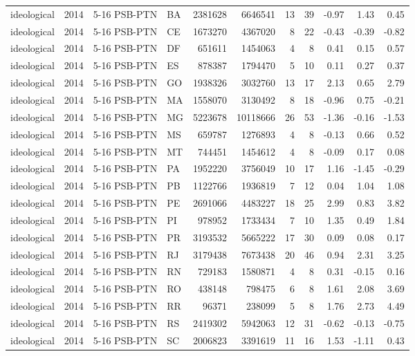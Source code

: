 \begin{landscape}
\begin{longtable}{lllL{1.4cm}rrrrrrr}
ideological & 2014 & 5-16 PSB-PTN & BA & 2381628 & 6646541 & 13 & 39 & -0.97 & 1.43 & 0.45 \\
ideological & 2014 & 5-16 PSB-PTN & CE & 1673270 & 4367020 & 8 & 22 & -0.43 & -0.39 & -0.82 \\
ideological & 2014 & 5-16 PSB-PTN & DF & 651611 & 1454063 & 4 & 8 & 0.41 & 0.15 & 0.57 \\
ideological & 2014 & 5-16 PSB-PTN & ES & 878387 & 1794470 & 5 & 10 & 0.11 & 0.27 & 0.37 \\
ideological & 2014 & 5-16 PSB-PTN & GO & 1938326 & 3032760 & 13 & 17 & 2.13 & 0.65 & 2.79 \\
ideological & 2014 & 5-16 PSB-PTN & MA & 1558070 & 3130492 & 8 & 18 & -0.96 & 0.75 & -0.21 \\
ideological & 2014 & 5-16 PSB-PTN & MG & 5223678 & 10118666 & 26 & 53 & -1.36 & -0.16 & -1.53 \\
ideological & 2014 & 5-16 PSB-PTN & MS & 659787 & 1276893 & 4 & 8 & -0.13 & 0.66 & 0.52 \\
ideological & 2014 & 5-16 PSB-PTN & MT & 744451 & 1454612 & 4 & 8 & -0.09 & 0.17 & 0.08 \\
ideological & 2014 & 5-16 PSB-PTN & PA & 1952220 & 3756049 & 10 & 17 & 1.16 & -1.45 & -0.29 \\
ideological & 2014 & 5-16 PSB-PTN & PB & 1122766 & 1936819 & 7 & 12 & 0.04 & 1.04 & 1.08 \\
ideological & 2014 & 5-16 PSB-PTN & PE & 2691066 & 4483227 & 18 & 25 & 2.99 & 0.83 & 3.82 \\
ideological & 2014 & 5-16 PSB-PTN & PI & 978952 & 1733434 & 7 & 10 & 1.35 & 0.49 & 1.84 \\
ideological & 2014 & 5-16 PSB-PTN & PR & 3193532 & 5665222 & 17 & 30 & 0.09 & 0.08 & 0.17 \\
ideological & 2014 & 5-16 PSB-PTN & RJ & 3179438 & 7673438 & 20 & 46 & 0.94 & 2.31 & 3.25 \\
ideological & 2014 & 5-16 PSB-PTN & RN & 729183 & 1580871 & 4 & 8 & 0.31 & -0.15 & 0.16 \\
ideological & 2014 & 5-16 PSB-PTN & RO & 438148 & 798475 & 6 & 8 & 1.61 & 2.08 & 3.69 \\
ideological & 2014 & 5-16 PSB-PTN & RR & 96371 & 238099 & 5 & 8 & 1.76 & 2.73 & 4.49 \\
ideological & 2014 & 5-16 PSB-PTN & RS & 2419302 & 5942063 & 12 & 31 & -0.62 & -0.13 & -0.75 \\
ideological & 2014 & 5-16 PSB-PTN & SC & 2006823 & 3391619 & 11 & 16 & 1.53 & -1.11 & 0.43 \\

\end{longtable}
\end{landscape}
